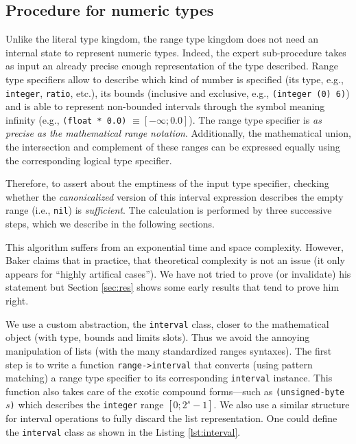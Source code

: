 \documentclass[format=sigconf]{acmart}
\newcommand\code[2][\small]{\sloppy\texttt{#1#2}}
\theoremstyle{definition}
\begin{document}
\subsection{Procedure for numeric types}
\label{sec:expnum}
Unlike the literal type kingdom, the range type kingdom does not need an
internal state to represent numeric types. Indeed, the expert sub-procedure
takes as input an already precise enough representation of the type described.
Range type specifiers allow to describe which kind of number is specified (its
type, e.g., \code{integer}, \code{ratio}, etc.), its bounds (inclusive and
exclusive, e.g., \code{(integer (0) 6)}) and is able to represent non-bounded
intervals through the symbol \code{*} meaning infinity (e.g., \code{(float *
  0.0)} $\equiv \left[-\infty; 0.0\right]$). The range type specifier is
\emph{as precise as the mathematical range notation}. Additionally, the
mathematical union, the intersection and complement of these ranges can
be expressed equally using the corresponding logical type specifier.

Therefore, to assert about the emptiness of the input type specifier, checking
whether the \emph{canonicalized} version of this interval expression describes
the empty range (i.e., \code{nil}) is \emph{sufficient}.
The calculation is performed by three successive steps, which we describe in the
following sections.

This algorithm suffers from an exponential time and space complexity. However,
Baker claims that in practice, that theoretical complexity is not an issue (it
only appears for ``highly artifical cases''). We have not tried to prove (or
invalidate) his statement but Section \ref{sec:res} shows some early results
that tend to prove him right.

We use a custom abstraction, the \code{interval} class, closer to the
mathematical object (with type, bounds and limits slots). Thus we avoid the
annoying manipulation of lists (with the many standardized ranges syntaxes).
The first step is to write a function \code{range->interval} that converts
(using pattern matching) a range type specifier to its corresponding
\code{interval} instance. This function also takes care of the exotic compound
forms---such as \code{(unsigned-byte $s$)} which describes the \code{integer}
range $\left[0; 2^s-1\right]$. We also use a similar structure for interval
operations to fully discard the list representation. One could define the
\code{interval} class as shown in the Listing \ref{lst:interval}.
\end{document}
